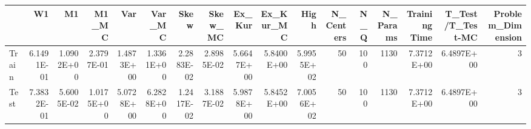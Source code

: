 \begin{tabular}{lrrrrrrrrrrrrrrrr}
\toprule
{} &         W1 &         M1 &      M1\_MC &        Var &     Var\_MC &       Skew &    Skew\_MC &     Ex\_Kur &  Ex\_Kur\_MC &       High &  N\_Centers &  N\_Q &  N\_Params &  Training Time &  T\_Test/T\_Test-MC &  Problem\_Dimension \\
\midrule
Train & 6.1491E-01 & 1.0902E+00 & 2.3797E-01 & 1.4873E+00 & 1.3361E+00 & 2.2883E-02 & 2.8985E-02 & 5.6647E+00 & 5.8400E+00 & 5.9955E+02 &         50 &  100 &      1130 &     7.3712E+00 &        6.4897E+00 &                  3 \\
Test  & 7.3832E-01 & 5.6005E-02 & 1.0175E+00 & 5.0728E+00 & 6.2828E+00 & 1.2417E-02 & 3.1887E-02 & 5.9878E+00 & 5.8452E+00 & 7.0056E+02 &         50 &  100 &      1130 &     7.3712E+00 &        6.4897E+00 &                  3 \\
\bottomrule
\end{tabular}
